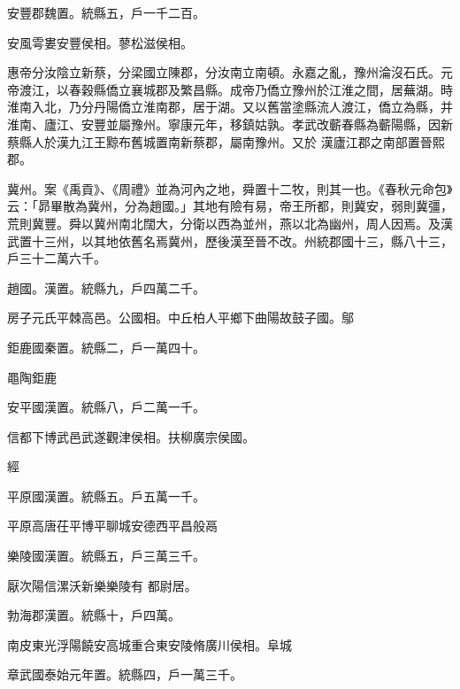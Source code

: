 \begin{pinyinscope}
 安豐郡魏置。統縣五，戶一千二百。



 安風雩婁安豐侯相。蓼松滋侯相。



 惠帝分汝陰立新蔡，分梁國立陳郡，分汝南立南頓。永嘉之亂，豫州淪沒石氏。元帝渡江，以春穀縣僑立襄城郡及繁昌縣。成帝乃僑立豫州於江淮之間，居蕪湖。時淮南入北，乃分丹陽僑立淮南郡，居于湖。又以舊當塗縣流人渡江，僑立為縣，并淮南、廬江、安豐並屬豫州。寧康元年，移鎮姑孰。孝武改蘄春縣為蘄陽縣，因新蔡縣人於漢九江王黥布舊城置南新蔡郡，屬南豫州。又於
 漢廬江郡之南部置晉熙郡。



 冀州。案《禹貢》、《周禮》並為河內之地，舜置十二牧，則其一也。《春秋元命包》云：「昴畢散為冀州，分為趙國。」其地有險有易，帝王所都，則冀安，弱則冀彊，荒則冀豐。舜以冀州南北闊大，分衛以西為並州，燕以北為幽州，周人因焉。及漢武置十三州，以其地依舊名焉冀州，歷後漢至晉不改。州統郡國十三，縣八十三，戶三十二萬六千。



 趙國。漢置。統縣九，戶四萬二千。



 房子元氏平棘高邑。公國相。中丘柏人平鄉下曲陽故鼓子國。鄔



 鉅鹿國秦置。統縣二，戶一萬四十。



 黽陶鉅鹿



 安平國漢置。統縣八，戶二萬一千。



 信都下博武邑武遂觀津侯相。扶柳廣宗侯國。



 經



 平原國漢置。統縣五。戶五萬一千。



 平原高唐茌平博平聊城安德西平昌般鬲



 樂陵國漢置。統縣五，戶三萬三千。



 厭次陽信漯沃新樂樂陵有
 都尉居。



 勃海郡漢置。統縣十，戶四萬。



 南皮東光浮陽饒安高城重合東安陵脩廣川侯相。阜城



 章武國泰始元年置。統縣四，戶一萬三千。




\end{pinyinscope}
